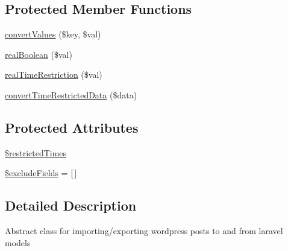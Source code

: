 \subsection*{Protected Member Functions}
\begin{DoxyCompactItemize}
\item 
\hyperlink{classDMA_1_1Friends_1_1Wordpress_1_1Post_a8969b8476b3ba0afc871532f6f936514}{convert\+Values} (\$key, \$val)
\item 
\hyperlink{classDMA_1_1Friends_1_1Wordpress_1_1Post_a37fb0931dadba67a39a637b336787663}{real\+Boolean} (\$val)
\item 
\hyperlink{classDMA_1_1Friends_1_1Wordpress_1_1Post_a5fbf4b003c2136d8497ddd7d726ad671}{real\+Time\+Restriction} (\$val)
\item 
\hyperlink{classDMA_1_1Friends_1_1Wordpress_1_1Post_a427b14dd99893217929ee8ee93977628}{convert\+Time\+Restricted\+Data} (\$data)
\end{DoxyCompactItemize}
\subsection*{Protected Attributes}
\begin{DoxyCompactItemize}
\item 
\hyperlink{classDMA_1_1Friends_1_1Wordpress_1_1Post_ac0b74792fa83b0a9dafda52eec451e50}{\$restricted\+Times}
\item 
\hyperlink{classDMA_1_1Friends_1_1Wordpress_1_1Post_ac9f76efeb858c94d5ab78e74b4301c16}{\$exclude\+Fields} = \mbox{[}$\,$\mbox{]}
\end{DoxyCompactItemize}


\subsection{Detailed Description}
Abstract class for importing/exporting wordpress posts to and from laravel models 

